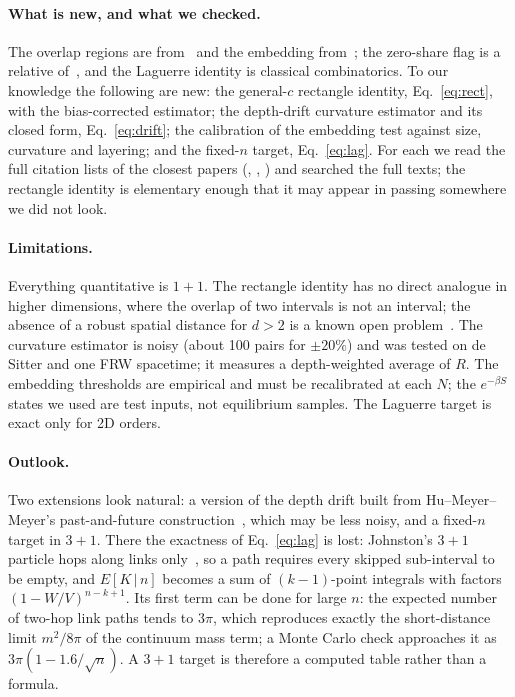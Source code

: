 \documentclass[11pt,a4paper]{article}
\begin{document}
\paragraph{What is new, and what we checked.} The overlap regions are from~\cite{BK24} and the embedding from~\cite{CloughEvans16}; the zero-share flag is a relative of~\cite{GlaserSurya13}, and the Laguerre identity is classical combinatorics. To our knowledge the following are new: the general-$c$ rectangle identity, Eq.~\eqref{eq:rect}, with the bias-corrected estimator; the depth-drift curvature estimator and its closed form, Eq.~\eqref{eq:drift}; the calibration of the embedding test against size, curvature and layering; and the fixed-$n$ target, Eq.~\eqref{eq:lag}. For each we read the full citation lists of the closest papers (\cite{BK24}, \cite{CloughEvans16}, \cite{Johnston08,Johnston09}) and searched the full texts; the rectangle identity is elementary enough that it may appear in passing somewhere we did not look.

\paragraph{Limitations.} Everything quantitative is $1+1$. The rectangle identity has no direct analogue in higher dimensions, where the overlap of two intervals is not an interval; the absence of a robust spatial distance for $d>2$ is a known open problem~\cite{Surya19}. The curvature estimator is noisy (about 100 pairs for $\pm20\%$) and was tested on de Sitter and one FRW spacetime; it measures a depth-weighted average of $R$. The embedding thresholds are empirical and must be recalibrated at each $N$; the $e^{-\beta S}$ states we used are test inputs, not equilibrium samples. The Laguerre target is exact only for 2D orders.

\paragraph{Outlook.} Two extensions look natural: a version of the depth drift built from Hu--Meyer--Meyer's past-and-future construction~\cite{HMM25}, which may be less noisy, and a fixed-$n$ target in $3+1$. There the exactness of Eq.~\eqref{eq:lag} is lost: Johnston's $3+1$ particle hops along links only~\cite{Johnston08}, so a path requires every skipped sub-interval to be empty, and $E[K\,|\,n]$ becomes a sum of $(k-1)$-point integrals with factors $(1-W/V)^{n-k+1}$. Its first term can be done for large $n$: the expected number of two-hop link paths tends to $3\pi$, which reproduces exactly the short-distance limit $m^2/8\pi$ of the continuum mass term; a Monte Carlo check approaches it as $3\pi(1-1.6/\sqrt n)$. A $3+1$ target is therefore a computed table rather than a formula.
\end{document}
